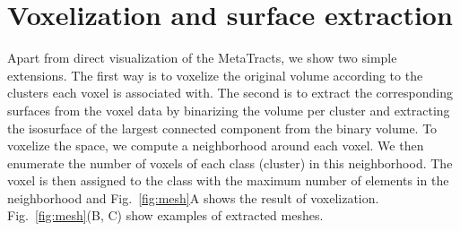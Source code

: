 \section {Voxelization and surface extraction}
\label{sec:vis}
Apart from direct visualization of the MetaTracts, we show two simple extensions. The first way is to voxelize the original volume according to the clusters each voxel is associated with.
The second is to extract the corresponding surfaces from the voxel data by binarizing the volume per cluster and extracting the isosurface of the largest connected component from the binary volume. To voxelize the space,  we compute a neighborhood around each voxel. We then enumerate the number of voxels of each class (cluster) in this neighborhood. The voxel is then assigned to the class with the maximum number of elements in the neighborhood and Fig.~\ref{fig:mesh}A shows the result of voxelization. Fig.~\ref{fig:mesh}(B, C) show examples of extracted meshes.
%
%
%
